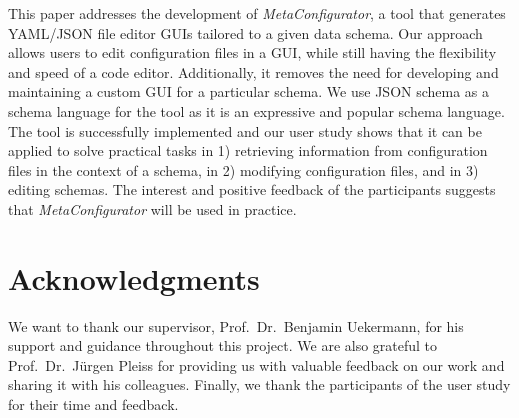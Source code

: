\documentclass[lettersize,journal]{IEEEtran}
\newcommand{\cfgfiles}{configuration files}
\newcommand{\toolname}{\textit{MetaConfigurator}}
\begin{document}
 This paper addresses the development of \toolname{}, a tool that generates YAML/JSON file editor GUIs tailored to a given data schema.
Our approach allows users to edit \cfgfiles{} in a GUI, while still having the flexibility and speed of a code editor.
Additionally, it removes the need for developing and maintaining a custom GUI for a particular schema.
We use JSON schema as a schema language for the tool as it is an expressive and popular schema language.
The tool is successfully implemented and our user study shows that it can be applied to solve practical tasks in 1) retrieving information from \cfgfiles{} in the context of a schema, in 2) modifying \cfgfiles{}, and in 3) editing schemas.
The interest and positive feedback of the participants suggests that \toolname{} will be used in practice.






\section*{Acknowledgments}
We want to thank our supervisor, Prof.\ Dr.\ Benjamin Uekermann, for his support and guidance throughout this project.
We are also grateful to Prof.\ Dr.\ Jürgen Pleiss for providing us with valuable feedback on our work and sharing it with his colleagues.
Finally, we thank the participants of the user study for their time and feedback.
\end{document}
